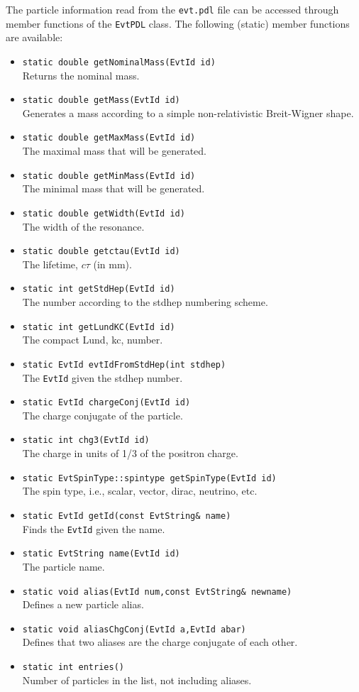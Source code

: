The particle information read from the {\tt evt.pdl} file can be
accessed through member functions of the {\tt EvtPDL} class. The 
following (static) member functions are available:
\begin{itemize}
\item {\tt  static double getNominalMass(EvtId id)}\\
      Returns the nominal mass.
\item {\tt static double getMass(EvtId id)}\\
      Generates a mass according to a simple non-relativistic
      Breit-Wigner shape.
\item {\tt static double getMaxMass(EvtId id)}\\
      The maximal mass that will be generated.
\item {\tt static double getMinMass(EvtId id)}\\
      The minimal mass that will be generated.
\item {\tt static double getWidth(EvtId id)}\\
      The width of the resonance.
\item {\tt static double getctau(EvtId id)}\\
      The lifetime, $c\tau$ (in mm).
\item {\tt static int getStdHep(EvtId id)}\\
      The number according to the stdhep numbering scheme.
\item {\tt static int getLundKC(EvtId id)}\\
      The compact Lund, kc, number.
\item {\tt static EvtId evtIdFromStdHep(int stdhep)}\\
      The {\tt EvtId} given the stdhep number.
\item {\tt static EvtId chargeConj(EvtId id)}\\
      The charge conjugate of the particle.
\item {\tt static int chg3(EvtId id)}\\
      The charge in units of 1/3 of the positron charge.
\item {\tt static EvtSpinType::spintype getSpinType(EvtId id)}\\
      The spin type, i.e., scalar, vector, dirac, neutrino, etc.
\item {\tt static EvtId getId(const EvtString\& name)}\\
      Finds the {\tt EvtId} given the name.
\item {\tt static EvtString name(EvtId id)}\\
      The particle name.
\item {\tt static void alias(EvtId num,const EvtString\& newname)}\\
      Defines a new particle alias.
\item {\tt static void aliasChgConj(EvtId a,EvtId abar)}\\
      Defines that two aliases are the charge conjugate of each other.
\item {\tt static int entries()}\\
      Number of particles in the list, not including aliases.
\end{itemize}


